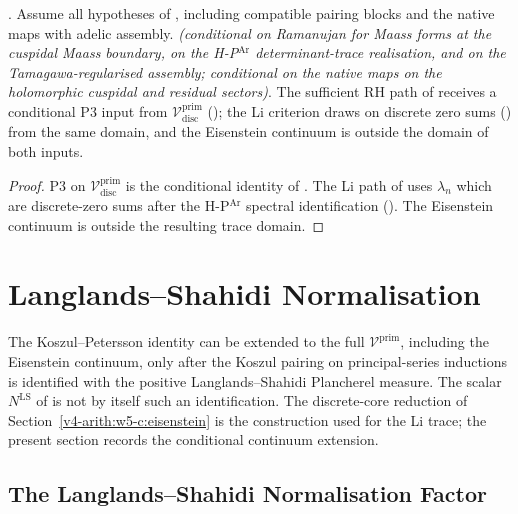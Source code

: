 \begin{corollary}
\label{v4-arith:w5-c:cor:Li-path-closes}
\ClaimStatusProvedHereConditional. Assume all hypotheses of
, including compatible
pairing blocks and the native maps with adelic assembly.
\emph{(conditional on Ramanujan for Maass
forms at the cuspidal Maass boundary, on the H-P\(^{\mathrm{Ar}}\)
determinant-trace realisation, and on the Tamagawa-regularised assembly;
conditional on the native maps on the holomorphic cuspidal and residual sectors)}. The sufficient RH path of  receives
a conditional P3 input from \(\mathcal{V}^{\mathrm{prim}}_{\mathrm{disc}}\)
(); the Li criterion
draws on discrete zero sums ()
from the same domain, and the Eisenstein continuum is outside the
domain of both inputs.
\end{corollary}

\begin{proof}
P3 on \(\mathcal{V}^{\mathrm{prim}}_{\mathrm{disc}}\) is the conditional
identity of . The Li path of
 uses \(\lambda_{n}\) which
are discrete-zero sums after the H-P\(^{\mathrm{Ar}}\) spectral
identification ().
The Eisenstein continuum is outside the resulting trace domain.
\end{proof}

\section{Langlands--Shahidi Normalisation}
\label{v4-arith:w5-c:LS}

The Koszul--Petersson identity can be extended to the full
\(\mathcal{V}^{\mathrm{prim}}\), including the Eisenstein continuum,
only after the Koszul pairing on principal-series inductions is
identified with the positive Langlands--Shahidi Plancherel measure.
The scalar \(N^{\mathrm{LS}}\) of 
is not by itself such an identification. The discrete-core reduction
of Section~\ref{v4-arith:w5-c:eisenstein} is the construction used for the
Li trace; the present section records the conditional continuum
extension.

\subsection{The Langlands--Shahidi Normalisation Factor}
\label{v4-arith:w5-c:LS:factor}

